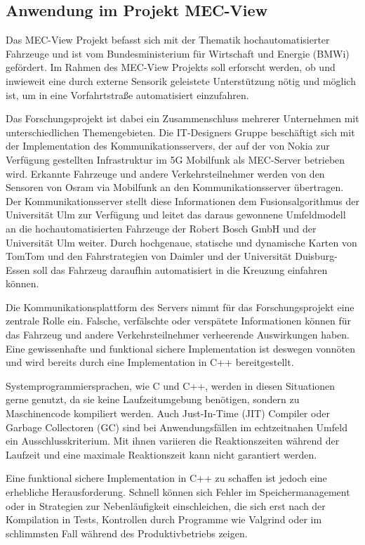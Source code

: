 \begin{multicols}{2}
\subsection*{Anwendung im Projekt MEC-View}

Das MEC-View Projekt befasst sich mit der Thematik hochautomatisierter Fahrzeuge und ist vom Bundesministerium für Wirtschaft und Energie (BMWi) gefördert.
Im Rahmen des MEC-View Projekts soll erforscht werden, ob und inwieweit eine durch externe Sensorik geleistete Unterstützung nötig und möglich ist, um in eine Vorfahrtstraße automatisiert einzufahren.

\bildIII

Das Forschungsprojekt ist dabei ein Zusammenschluss mehrerer Unternehmen mit unterschiedlichen Themengebieten. Die IT-Designers Gruppe beschäftigt sich mit der Implementation des Kommunikationsservers, der auf der von Nokia zur Verfügung gestellten
Infrastruktur im 5G Mobilfunk als MEC-Server betrieben wird. Erkannte Fahrzeuge und
andere Verkehrsteilnehmer werden von den Sensoren von Osram via Mobilfunk an den
Kommunikationsserver übertragen. Der Kommunikationsserver stellt diese Informationen
dem Fusionsalgorithmus der Universität Ulm zur Verfügung und leitet das daraus gewonnene Umfeldmodell an die hochautomatisierten Fahrzeuge der Robert Bosch GmbH und der Universität
Ulm weiter. Durch hochgenaue, statische und dynamische Karten von TomTom und den
Fahrstrategien von Daimler und der Universität Duisburg-Essen soll das Fahrzeug daraufhin automatisiert in die Kreuzung einfahren können.

Die Kommunikationsplattform des Servers nimmt für das Forschungsprojekt eine zentrale Rolle ein.
Falsche, verfälschte oder verspätete Informationen können für das Fahrzeug und andere Verkehrsteilnehmer verheerende Auswirkungen haben.
Eine gewissenhafte und funktional sichere Implementation ist deswegen vonnöten und wird bereits durch eine Implementation in C++ bereitgestellt.

Systemprogrammiersprachen, wie C und C++, werden in diesen Situationen gerne genutzt, da sie keine Laufzeitumgebung benötigen, sondern zu Maschinencode kompiliert werden.
Auch Just-In-Time (JIT) Compiler oder Garbage Collectoren (GC) sind bei Anwendungsfällen im echtzeitnahen Umfeld ein Ausschlusskriterium.
Mit ihnen variieren die Reaktionszeiten während der Laufzeit und eine maximale Reaktionszeit kann nicht garantiert werden.

Eine funktional sichere Implementation in C++ zu schaffen ist jedoch eine erhebliche Herausforderung.
Schnell können sich Fehler im Speichermanagement oder in Strategien zur Nebenläufigkeit einschleichen, die sich erst nach der Kompilation in Tests, Kontrollen durch Programme wie Valgrind oder im schlimmsten Fall während des Produktivbetriebs zeigen.


\end{multicols}
